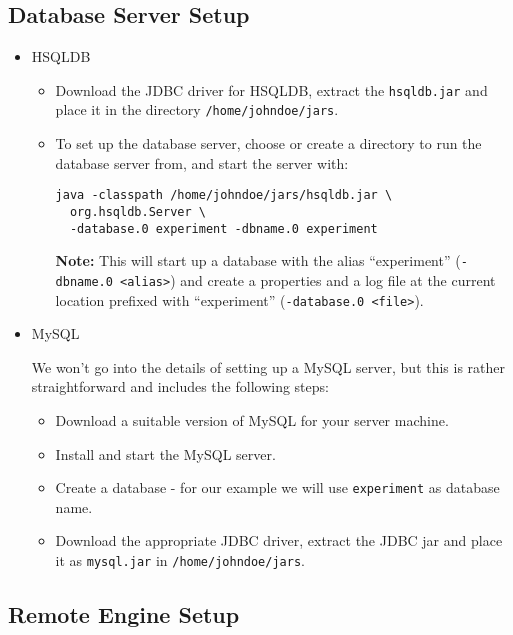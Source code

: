 \subsection{Database Server Setup}

\begin{itemize}
	\item HSQLDB
	
		\begin{itemize}
			\item Download the JDBC driver for HSQLDB, extract the \texttt{hsqldb.jar} and place it in the directory \texttt{/home/johndoe/jars}.
			
			\item To set up the database server, choose or create a directory to run the database server from, and start the server with:

				\begin{verbatim}
java -classpath /home/johndoe/jars/hsqldb.jar \
  org.hsqldb.Server \
  -database.0 experiment -dbname.0 experiment
				\end{verbatim}
				
				\textbf{Note:} This will start up a database with the alias ``experiment'' (\texttt{-dbname.0 <alias>}) and create a properties and a log file at the current location prefixed with ``experiment'' (\texttt{-database.0 <file>}).
				
		\end{itemize}
		
	\item MySQL
	
We won't go into the details of setting up a MySQL server, but this is rather straightforward and includes the following steps:

		\begin{itemize}
  			\item Download a suitable version of MySQL for your server machine.
  			\item Install and start the MySQL server.
  			\item Create a database - for our example we will use \texttt{experiment} as database name.
  			\item Download the appropriate JDBC driver, extract the JDBC jar and place it as \texttt{mysql.jar} in \texttt{/home/johndoe/jars}.
		\end{itemize}
		
\end{itemize}

\subsection{Remote Engine Setup}

